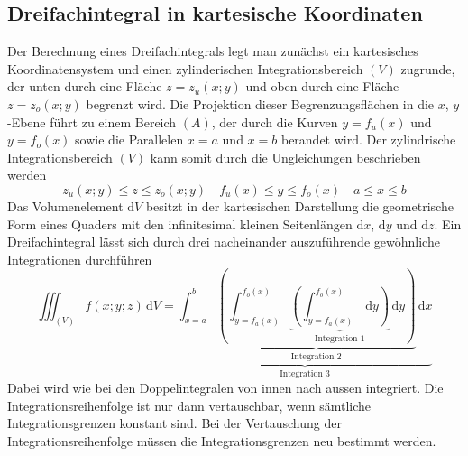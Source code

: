 \subsection{Dreifachintegral in kartesische Koordinaten}
Der Berechnung eines Dreifachintegrals legt man zunächst ein kartesisches Koordinatensystem und einen zylinderischen Integrationsbereich $\left(V\right)$ zugrunde, der unten durch eine Fläche $z=z_u\left(x; y\right)$ und oben durch eine Fläche $z=z_o\left(x; y\right)$ begrenzt wird. Die Projektion dieser Begrenzungsflächen in die $x$, $y$-Ebene führt zu einem Bereich $\left(A\right)$, der durch die Kurven $y=f_u\left(x\right)$ und $y=f_o\left(x\right)$ sowie die Parallelen $x=a$ und $x=b$ berandet wird.
\newline\newline
Der zylindrische Integrationsbereich $\left(V\right)$ kann somit durch die Ungleichungen beschrieben werden
\begin{equation}
\boxed{z_u\left(x; y\right)\leq z\leq z_o\left(x; y\right)}\quad \boxed{f_u\left(x\right)\leq y\leq f_o\left(x\right)}\quad \boxed{a\leq x\leq b}
\end{equation}
Das Volumenelement $\text{d}V$ besitzt in der kartesischen Darstellung die geometrische Form eines Quaders mit den infinitesimal kleinen Seitenlängen $\text{d}x$, $\text{d}y$ und $\text{d}z$. Ein Dreifachintegral lässt sich durch drei nacheinander auszuführende gewöhnliche Integrationen durchführen
\begin{equation}
\boxed{\displaystyle \iiint_{\left(V\right)}f\left(x; y; z\right)\,\text{d}V=\underbrace{\displaystyle \int_{x=a}^b\underbrace{\left(\displaystyle \int_{y=f_a\left(x\right)}^{f_o\left(x\right)}\underbrace{\left(\displaystyle \int_{y=f_a\left(x\right)}^{f_o\left(x\right)}\,\text{d}y\right)}_{\text{Integration 1}}\,\text{d}y\right)}_{\text{Integration 2}}\,\text{d}x}_{\text{Integration 3}}}
\end{equation}
Dabei wird wie bei den Doppelintegralen von innen nach aussen integriert. Die Integrationsreihenfolge ist nur dann vertauschbar, wenn sämtliche Integrationsgrenzen konstant sind. Bei der Vertauschung der Integrationsreihenfolge müssen die Integrationsgrenzen neu bestimmt werden.
